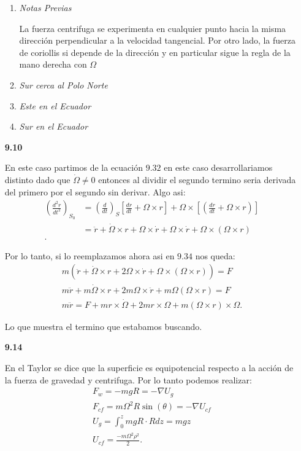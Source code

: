 \documentclass[12pt]{exam}
\begin{document}
\begin{enumerate}
    \begin{enumerate}
      \item \textit{Notas Previas}

	La fuerza centrifuga se experimenta en cualquier punto hacia la misma dirección perpendicular a la velocidad tangencial. Por otro lado, la fuerza de coriollis si depende de la dirección y en particular sigue la regla de la mano derecha con $\Omega$
      \item \textit{Sur cerca al Polo Norte}
      \item \textit{Este en el Ecuador}
      \item \textit{Sur en el Ecuador}
    \end{enumerate}
  \item[\textbf{9.10}]
    
    En este caso partimos de la ecuación $9.32$ en este caso desarrollariamos distinto dado que  $\dot{\Omega}\neq 0$ entonces al dividir el segundo termino seria derivada del primero por el segundo sin derivar. Algo asi:
     \begin{align*}
      \left( \frac{d^2r}{dt^2} \right)_{S_0} &= \left( \frac{d}{dt} \right)_S \left[ \frac{dr}{dt}+\Omega\times r \right] + \Omega\times \left[ \left( \frac{dr}{dt}+\Omega\times r \right)  \right]  \\
					     &= \ddot{r} + \dot{\Omega}\times r + \Omega\times \dot{r} + \Omega\times \dot{r} + \Omega\times \left( \Omega\times r \right)  \\
    .\end{align*}

    Por lo tanto, si lo reemplazamos ahora asi en $9.34$ nos queda:
    \begin{align*}
      m\left( \ddot{r} + \dot{\Omega}\times r + 2\Omega\times\dot{r} + \Omega\times \left( \Omega\times r \right)   \right) = F\\
      m\ddot{r} + m\dot{\Omega}\times r + 2m\Omega\times \ddot{r} + m\Omega \left( \Omega\times r \right) = F \\
      m\ddot{r} = F + mr\times \dot{\Omega} + 2mr\times \Omega + m\left( \Omega\times r \right) \times \Omega
    .\end{align*}

    Lo que muestra el termino que estabamos buscando.
  \item[\textbf{9.14}]

    En el Taylor se dice que la superficie es equipotencial respecto a la acción de la fuerza de gravedad y centrifuga. Por lo tanto podemos realizar:
    \begin{align*}
      F_{w}=-mgR = -\nabla U_{g}\\
      F_{cf}=m\Omega^2R\sin\left( \theta \right) = - \nabla U_{cf}\\
      U_{g}=\int_{0}^{z}mgR\cdot Rdz = mgz\\
      U_{cf}=\frac{-m\Omega^2\rho^2}{2}
    .\end{align*}


\end{enumerate}
\end{document}
